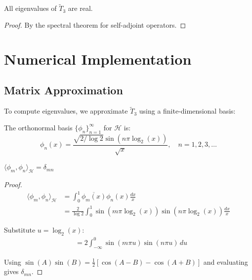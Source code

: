 \begin{corollary}\label{cor:real-eigenvalues}
All eigenvalues of $\tilde{T}_3$ are real.
\end{corollary}

\begin{proof}
By the spectral theorem for self-adjoint operators\cite{reed1980,rudin1976}.
\end{proof}

\section{Numerical Implementation}\label{sec:numerical-implementation}

\subsection{Matrix Approximation}

To compute eigenvalues, we approximate $\tilde{T}_3$ using a finite-dimensional basis:

\begin{defn}\label{def:computational-basis}
The orthonormal basis $\{\phi_n\}_{n=1}^{\infty}$ for $\mathcal{H}$ is:
\begin{equation}
\phi_n(x) = \frac{\sqrt{2/\log 2} \sin(n\pi\log_2(x))}{\sqrt{x}}, \quad n = 1, 2, 3, \ldots
\end{equation}
\end{defn}

\begin{proposition}[Orthonormality]\label{prop:basis-orthonormal}
$\langle \phi_m, \phi_n \rangle_{\mathcal{H}} = \delta_{mn}$
\end{proposition}

\begin{proof}
\begin{align}
\langle \phi_m, \phi_n \rangle_{\mathcal{H}} &= \int_0^1 \overline{\phi_m(x)} \phi_n(x) \frac{dx}{x}\\
&= \frac{2}{\log 2} \int_0^1 \sin(m\pi\log_2(x)) \sin(n\pi\log_2(x)) \frac{dx}{x}
\end{align}

Substitute $u = \log_2(x)$:
\begin{align}
&= 2 \int_{-\infty}^0 \sin(m\pi u) \sin(n\pi u) \, du
\end{align}

Using $\sin(A)\sin(B) = \frac{1}{2}[\cos(A-B) - \cos(A+B)]$ and evaluating gives $\delta_{mn}$.
\end{proof}

